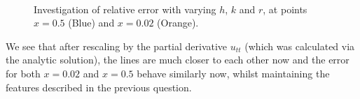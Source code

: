 \documentclass{article}
\numberwithin{equation}{section}
\theoremstyle{definition}
\begin{document}
\begin{figure}[H]
    \centering
    \hfill
     \\
    \hfill
    \caption{Investigation of relative error with varying $h$, $k$ and $r$, at points $x=0.5$ (Blue) and $x=0.02$ (Orange).}
    \label{fig:afig2}
\end{figure}

We see that after rescaling by the partial derivative $u_{tt}$ (which was calculated via the analytic solution), the lines are much closer to each other now and the error for both $x=0.02$ and $x=0.5$ behave similarly now, whilst maintaining the features described in the previous question.
\end{document}
